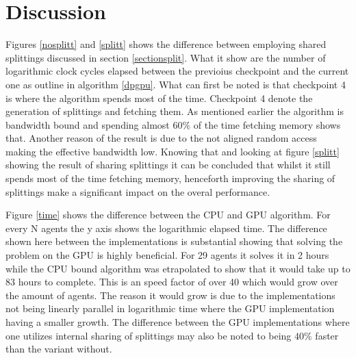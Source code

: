 \documentclass{llncs}
\begin{document}
\section{Discussion} %
Figures \ref{nosplitt} and \ref{splitt} shows the difference between employing 
shared splittings discussed in section \ref{sectionsplit}. 
What it show are the number of logarithmic clock cycles elapsed between the 
previoius checkpoint and the current one as outline in algorithm \ref{dpgpu}.
What can first be noted is that checkpoint 4 is where the algorithm spends most of the time. 
Checkpoint 4 denote the generation of splittings and fetching them.
As mentioned earlier the algorithm is bandwidth bound and spending almost
$60\%$ of the time fetching memory shows that. Another reason of the result
is due to the not aligned random access making the effective bandwidth low.
Knowing that and looking at figure \ref{splitt} showing the result of sharing splittings it can be concluded that whilst it still spends most 
of the time fetching memory, henceforth improving the sharing of splittings make a significant impact on the overal performance.

Figure \ref{time} shows the difference between the CPU and GPU algorithm.
For every N agents the y axis shows the logarithmic elapsed time. The difference shown here between the implementations is substantial showing
that solving the problem on the GPU is highly beneficial. For 29 agents it solves it in 2 hours while the CPU bound algorithm was etrapolated to show that it would take up to 83 hours to complete. This is an speed factor of over 40 which would grow over the amount of agents. The reason it would grow is due to the implementations not being linearly parallel in logarithmic time where the GPU implementation having a smaller growth.
The difference between the GPU implementations where one utilizes internal 
sharing of splittings may also be noted to being $40\%$ faster than the variant without.
\end{document}
